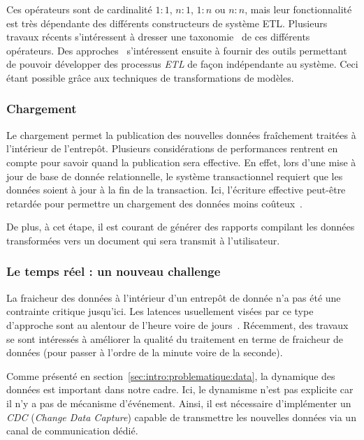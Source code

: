 
Ces opérateurs sont de cardinalité $1\!\!:\!\!1$, $n\!\!:\!\!1$, $1\!\!:\!\!n$ ou $n\!\!:\!\!n$, mais leur fonctionnalité est très dépendante des différents constructeurs de système ETL. Plusieurs travaux récents s'intéressent à dresser une taxonomie~\cite{Vassiliadis:taxonomy} de ces différents opérateurs. Des approches~\cite{Akkaoui:etl,Trujilo:uml-etl} s'intéressent ensuite à fournir des outils permettant de pouvoir développer des processus \textit{ETL} de façon indépendante au système. Ceci étant possible grâce aux techniques de transformations de modèles.

\subsubsection{Chargement}
Le chargement permet la publication des nouvelles données fraîchement traitées à l'intérieur de l'entrepôt. Plusieurs considérations de performances rentrent en compte pour savoir quand la publication sera effective. En effet, lors d'une mise à jour de base de donnée relationnelle, le système transactionnel requiert que les données soient à jour à la fin de la transaction. Ici, l'écriture effective peut-être retardée pour permettre un chargement des données moins coûteux~\cite{Petit:historical}.

De plus, à cet étape, il est courant de générer des rapports compilant les données transformées vers un document qui sera transmit à l'utilisateur.

\subsubsection{Le temps réel : un nouveau challenge}
La fraicheur des données à l'intérieur d'un entrepôt de donnée n'a pas été une contrainte critique jusqu'ici. Les latences usuellement visées par ce type d'approche sont au alentour de l'heure voire de jours~\cite{Oracle:realtimedw}. Récemment, des travaux se sont intéressés à améliorer la qualité du traitement en terme de fraicheur de données (pour passer à l'ordre de la minute voire de la seconde).

Comme présenté en section~\ref{sec:intro:problematique:data}, la dynamique des données est important dans notre cadre. Ici, le dynamisme n'est pas explicite car il n'y a pas de mécanisme d'événement. Ainsi, il est nécessaire d'implémenter un \textit{CDC} (\textit{Change Data Capture}) capable de transmettre les nouvelles données via un canal de communication dédié.

